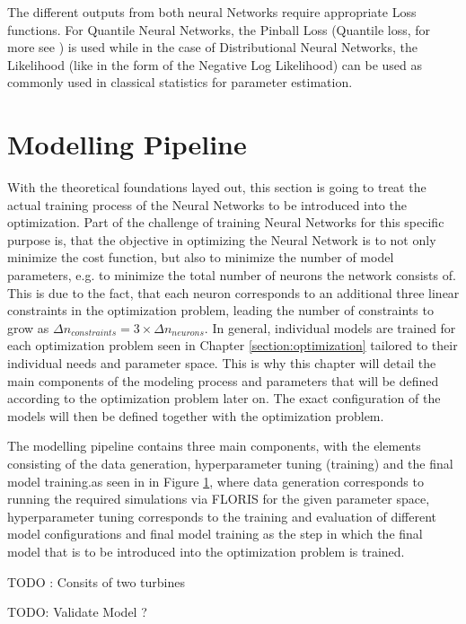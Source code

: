 The different outputs from both neural Networks require appropriate Loss functions. For Quantile Neural Networks, the Pinball Loss (Quantile loss, for more see \cite{Steinwart_2011}) is used while in the case of Distributional Neural Networks, the Likelihood (like in the form of the Negative Log Likelihood)  can be used as commonly used in classical statistics for parameter estimation. 

\cite{Akpabio} \cite{Marcjasz_2023}

\section{Modelling Pipeline}

With the theoretical foundations layed out, this section is going to treat the actual training process of the Neural Networks to be introduced into the optimization. Part of the challenge of training Neural Networks for this specific purpose is, that the objective in optimizing the Neural Network is to not only minimize the cost function, but also to minimize the  number of model parameters, e.g. to minimize the total number of neurons the network consists of. This is due to the fact, that each neuron corresponds to an additional three linear constraints in the optimization problem, leading the number of constraints to grow as $\Delta n_{constraints} =3 \times \Delta n_{neurons}$. In general, individual models are trained for each optimization problem seen in Chapter \ref{section:optimization} tailored to their individual needs and parameter space. This is why this chapter will detail the main components of the modeling process and parameters that will be defined according to the optimization problem later on. The exact configuration of the models will then be defined together with the optimization problem.  

The modelling pipeline contains three main components, with the elements consisting of the data generation, hyperparameter tuning (training) and the final model training.as seen in in Figure \ref{}, where data generation corresponds to running the required simulations via FLORIS  for the given parameter space, hyperparameter tuning corresponds to the training and evaluation of different model configurations and final model training as the step in which the final model that is to be introduced into the optimization problem is trained.


TODO : Consits of two turbines

TODO: Validate Model ? 

